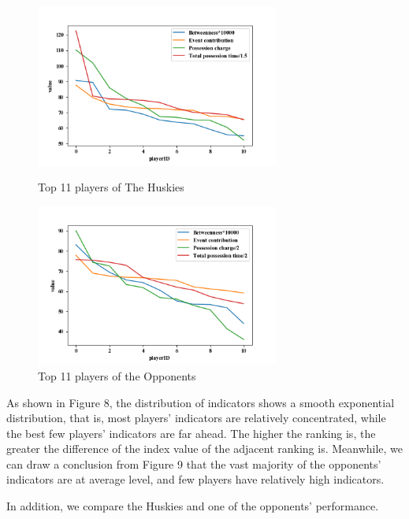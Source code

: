 \documentclass{mcmthesis}
\begin{document}
{\begin{figure}[h]
	\begin{minipage}[t]{0.5\textwidth}
		\centering
		\includegraphics[width=8cm]{value_of_person_per_season_Huskies.png}
		\caption{Top 11 players of The Huskies \label{fig:aa}}
	\end{minipage}
	\qquad
	\begin{minipage}[t]{0.5\textwidth}
		\centering
		\includegraphics[width=8cm]{value_of_person_per_season_Opponents.png}
		\caption{Top 11 players of the Opponents\label{fig:aa}}
	\end{minipage}
\end{figure}

As shown in Figure 8, the distribution of indicators shows a smooth exponential distribution, that is, most players' indicators are relatively concentrated, while the best few players' indicators are far ahead. The higher the ranking is, the greater the difference of the index value of the adjacent ranking is. Meanwhile, we can draw a conclusion from Figure 9 that the vast majority of the opponents' indicators are at average level, and few players have relatively high indicators.


In addition, we compare the Huskies and one of the opponents' performance.

}
\end{document}

